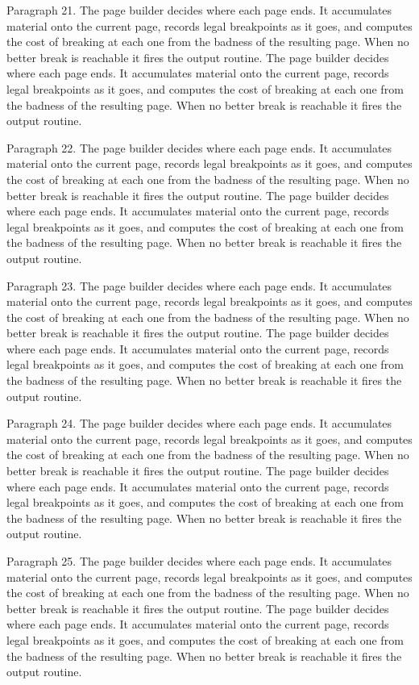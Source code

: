 Paragraph 21. The page builder decides where each page ends. It accumulates material onto the current page, records legal breakpoints as it goes, and computes the cost of breaking at each one from the badness of the resulting page. When no better break is reachable it fires the output routine. The page builder decides where each page ends. It accumulates material onto the current page, records legal breakpoints as it goes, and computes the cost of breaking at each one from the badness of the resulting page. When no better break is reachable it fires the output routine. 

Paragraph 22. The page builder decides where each page ends. It accumulates material onto the current page, records legal breakpoints as it goes, and computes the cost of breaking at each one from the badness of the resulting page. When no better break is reachable it fires the output routine. The page builder decides where each page ends. It accumulates material onto the current page, records legal breakpoints as it goes, and computes the cost of breaking at each one from the badness of the resulting page. When no better break is reachable it fires the output routine. 

Paragraph 23. The page builder decides where each page ends. It accumulates material onto the current page, records legal breakpoints as it goes, and computes the cost of breaking at each one from the badness of the resulting page. When no better break is reachable it fires the output routine. The page builder decides where each page ends. It accumulates material onto the current page, records legal breakpoints as it goes, and computes the cost of breaking at each one from the badness of the resulting page. When no better break is reachable it fires the output routine. 

Paragraph 24. The page builder decides where each page ends. It accumulates material onto the current page, records legal breakpoints as it goes, and computes the cost of breaking at each one from the badness of the resulting page. When no better break is reachable it fires the output routine. The page builder decides where each page ends. It accumulates material onto the current page, records legal breakpoints as it goes, and computes the cost of breaking at each one from the badness of the resulting page. When no better break is reachable it fires the output routine. 

Paragraph 25. The page builder decides where each page ends. It accumulates material onto the current page, records legal breakpoints as it goes, and computes the cost of breaking at each one from the badness of the resulting page. When no better break is reachable it fires the output routine. The page builder decides where each page ends. It accumulates material onto the current page, records legal breakpoints as it goes, and computes the cost of breaking at each one from the badness of the resulting page. When no better break is reachable it fires the output routine. 

